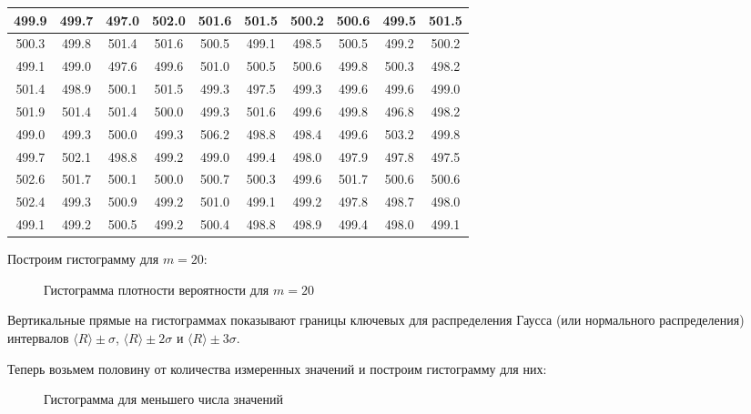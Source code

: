 \documentclass[12pt]{article}
\begin{document}
\begin{table}[]
\begin{tabular}{|c|c|c|c|c|c|c|c|c|c|}
        499.9 & 499.7 & 497.0 & 502.0 & 501.6 & 501.5 & 500.2 & 500.6 & 499.5 & 501.5 \\ \hline
        500.3 & 499.8 & 501.4 & 501.6 & 500.5 & 499.1 & 498.5 & 500.5 & 499.2 & 500.2 \\ \hline
        499.1 & 499.0 & 497.6 & 499.6 & 501.0 & 500.5 & 500.6 & 499.8 & 500.3 & 498.2 \\ \hline
        501.4 & 498.9 & 500.1 & 501.5 & 499.3 & 497.5 & 499.3 & 499.6 & 499.6 & 499.0 \\ \hline
        501.9 & 501.4 & 501.4 & 500.0 & 499.3 & 501.6 & 499.6 & 499.8 & 496.8 & 498.2 \\ \hline
        499.0 & 499.3 & 500.0 & 499.3 & 506.2 & 498.8 & 498.4 & 499.6 & 503.2 & 499.8 \\ \hline
        499.7 & 502.1 & 498.8 & 499.2 & 499.0 & 499.4 & 498.0 & 497.9 & 497.8 & 497.5 \\ \hline
        502.6 & 501.7 & 500.1 & 500.0 & 500.7 & 500.3 & 499.6 & 501.7 & 500.6 & 500.6 \\ \hline
        502.4 & 499.3 & 500.9 & 499.2 & 501.0 & 499.1 & 499.2 & 497.8 & 498.7 & 498.0 \\ \hline
        499.1 & 499.2 & 500.5 & 499.2 & 500.4 & 498.8 & 498.9 & 499.4 & 498.0 & 499.1 \\ \hline
        \end{tabular}
    \end{table}

    Построим гистограмму для $m = 20$:
    \begin{figure}[H]
        \centering
        
        \caption{Гистограмма плотности вероятности для $m = 20$}
    \end{figure}

    \par Вертикальные прямые на гистограммах показывают границы ключевых
    для распределения Гаусса (или нормального распределения) интервалов
    $\langle R \rangle \pm \sigma$, $\langle R \rangle \pm 2\sigma$ и
    $\langle R \rangle \pm 3\sigma$.
    \par Теперь возьмем половину от количества измеренных значений и построим
    гистограмму для них:
    \begin{figure}[H]
        \centering
        
        \caption{Гистограмма для меньшего числа значений}
    \end{figure}
\end{document}
